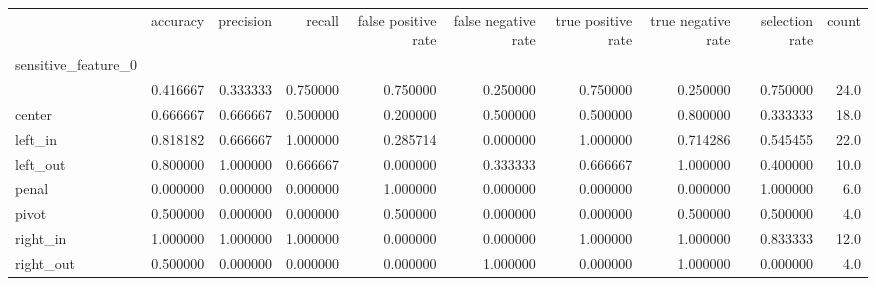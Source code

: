 \begin{tabular}{lrrrrrrrrr}
\toprule
{} &  accuracy &  precision &    recall &  false positive rate &  false negative rate &  true positive rate &  true negative rate &  selection rate &  count \\
sensitive\_feature\_0 &           &            &           &                      &                      &                     &                     &                 &        \\
\midrule
                    &  0.416667 &   0.333333 &  0.750000 &             0.750000 &             0.250000 &            0.750000 &            0.250000 &        0.750000 &   24.0 \\
center              &  0.666667 &   0.666667 &  0.500000 &             0.200000 &             0.500000 &            0.500000 &            0.800000 &        0.333333 &   18.0 \\
left\_in             &  0.818182 &   0.666667 &  1.000000 &             0.285714 &             0.000000 &            1.000000 &            0.714286 &        0.545455 &   22.0 \\
left\_out            &  0.800000 &   1.000000 &  0.666667 &             0.000000 &             0.333333 &            0.666667 &            1.000000 &        0.400000 &   10.0 \\
penal               &  0.000000 &   0.000000 &  0.000000 &             1.000000 &             0.000000 &            0.000000 &            0.000000 &        1.000000 &    6.0 \\
pivot               &  0.500000 &   0.000000 &  0.000000 &             0.500000 &             0.000000 &            0.000000 &            0.500000 &        0.500000 &    4.0 \\
right\_in            &  1.000000 &   1.000000 &  1.000000 &             0.000000 &             0.000000 &            1.000000 &            1.000000 &        0.833333 &   12.0 \\
right\_out           &  0.500000 &   0.000000 &  0.000000 &             0.000000 &             1.000000 &            0.000000 &            1.000000 &        0.000000 &    4.0 \\
\bottomrule
\end{tabular}
